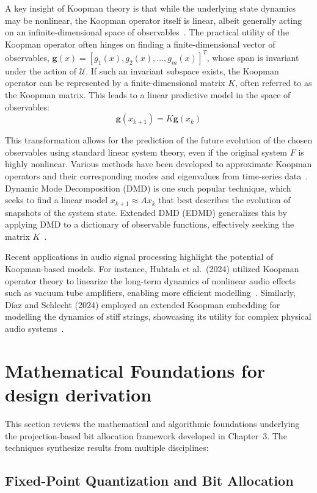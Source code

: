 A key insight of Koopman theory is that while the underlying state dynamics may be nonlinear, the Koopman operator itself is linear, albeit generally acting on an infinite-dimensional space of observables~\cite{Budisic2012}. The practical utility of the Koopman operator often hinges on finding a finite-dimensional vector of observables, $\mathbf{g}(x) = [g_1(x), g_2(x), \ldots, g_m(x)]^T$, whose span is invariant under the action of $\mathcal{U}$. If such an invariant subspace exists, the Koopman operator can be represented by a finite-dimensional matrix $K$, often referred to as the Koopman matrix. This leads to a linear predictive model in the space of observables:
\[
\mathbf{g}(x_{k+1}) = K\mathbf{g}(x_k)
\]

This transformation allows for the prediction of the future evolution of the chosen observables using standard linear system theory, even if the original system $F$ is highly nonlinear. Various methods have been developed to approximate Koopman operators and their corresponding modes and eigenvalues from time-series data~\cite{Schmid2010,Williams2015}. Dynamic Mode Decomposition (DMD) is one such popular technique, which seeks to find a linear model $x_{k+1} \approx Ax_k$ that best describes the evolution of snapshots of the system state. Extended DMD (EDMD) generalizes this by applying DMD to a dictionary of observable functions, effectively seeking the matrix $K$~\cite{Williams2015}.

Recent applications in audio signal processing highlight the potential of Koopman-based models. For instance, Huhtala et al.\ (2024) utilized Koopman operator theory to linearize the long-term dynamics of nonlinear audio effects such as vacuum tube amplifiers, enabling more efficient modelling~\cite{Huhtala2024}. Similarly, Díaz and Schlecht (2024) employed an extended Koopman embedding for modelling the dynamics of stiff strings, showcasing its utility for complex physical audio systems~\cite{DiazSchlecht2024}.

\section{Mathematical Foundations for design derivation}

This section reviews the mathematical and algorithmic foundations underlying the projection-based bit allocation framework developed in Chapter~3. The techniques synthesize results from multiple disciplines:

\subsection{Fixed-Point Quantization and Bit Allocation}

